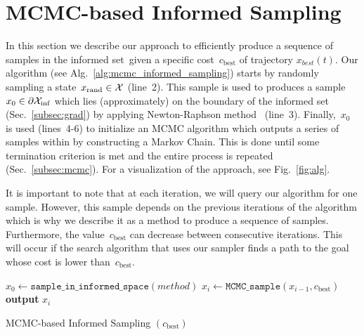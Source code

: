 \documentclass[letterpaper, 10 pt, conference]{ieeeconf}  %
\begin{document}
\section{MCMC-based Informed Sampling}
\label{sec:algorithm}

In this section we describe our approach to efficiently produce a sequence of samples in the informed set~\Cinf given a specific cost~$c_{\text{best}}$ of trajectory $x_{best}(t)$.
Our algorithm (see Alg.~\ref{alg:mcmc_informed_sampling}) starts by randomly sampling a state~$x_\text{rand} \in \mathcal{X}$ (line~2).
This sample is used to produces a 
sample~$x_0 \in \partial\mathcal{X}_{\rm {inf}}$ 
which lies (approximately) on the boundary of the informed set (Sec.~\ref{subsec:grad}) by applying Newton-Raphson method~\cite{RT06} (line~3).
Finally,~$x_0$ 
is used (lines~4-6)
to initialize an MCMC algorithm which outputs a series of samples within \Cinf by constructing a Markov Chain.
This is done until some termination criterion is met and the entire process is repeated (Sec.~\ref{subsec:mcmc}). 
For a visualization of the approach, see Fig.~\ref{fig:alg}.

It is important to note that at each iteration, we will query our algorithm for one sample. However, this sample depends on the previous iterations of the algorithm which is why we describe it as a method to produce a sequence of samples.
Furthermore, the value~$c_{\text{best}}$ can decrease between consecutive iterations.
This will occur if the search algorithm that uses our sampler finds a path to the goal whose cost is lower than~$c_{\text{best}}$.


\begin{algorithm}[t]
	\begin{algorithmic}[1]
		\LOOP
			\STATE $x_{0} \leftarrow \texttt{sample\_in\_informed\_space}( method )$
			\STATE $x_{i} \leftarrow \texttt{MCMC\_sample} (x_{i-1}, c_{\text{best}})$
			\STATE \textbf{output} $x_{i}$
			\ENDWHILE
		\ENDLOOP 
   	\end{algorithmic}
	\caption{MCMC-based Informed Sampling $(c_{\text{best}})$}
	\label{alg:mcmc_informed_sampling}	
\end{algorithm}
\end{document}

